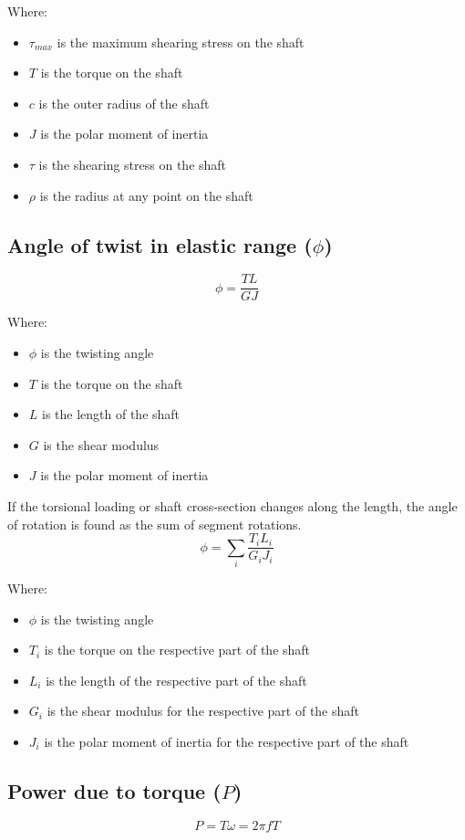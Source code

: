 \documentclass[11pt]{article}
\begin{document}
Where:
\begin{itemize}
\item \(\tau_{max}\) is the maximum shearing stress on the shaft
\item \(T\) is the torque on the shaft
\item \(c\) is the outer radius of the shaft
\item \(J\) is the polar moment of inertia
\item \(\tau\) is the shearing stress on the shaft
\item \(\rho\) is the radius at any point on the shaft
\end{itemize}

\newpage
\subsection{Angle of twist in elastic range (\(\phi\))}
\label{sec:org4b5e038}
\[\phi = \frac{TL}{GJ}\]

Where:
\begin{itemize}
\item \(\phi\) is the twisting angle
\item \(T\) is the torque on the shaft
\item \(L\) is the length of the shaft
\item \(G\) is the shear modulus
\item \(J\) is the polar moment of inertia
\end{itemize}

If the torsional loading or shaft cross-section changes along the length, the angle of rotation is found as the sum of segment rotations.
\[\phi = \sum_i \frac{T_i L_i}{G_i J_i}\]

Where:
\begin{itemize}
\item \(\phi\) is the twisting angle
\item \(T_i\) is the torque on the respective part of the shaft
\item \(L_i\) is the length of the respective part of the shaft
\item \(G_i\) is the shear modulus for the respective part of the shaft
\item \(J_i\) is the polar moment of inertia for the respective part of the shaft
\end{itemize}
\subsection{Power due to torque (\(P\))}
\label{sec:org1a03f8c}
\[P = T \omega = 2 \pi f T\]
\end{document}
